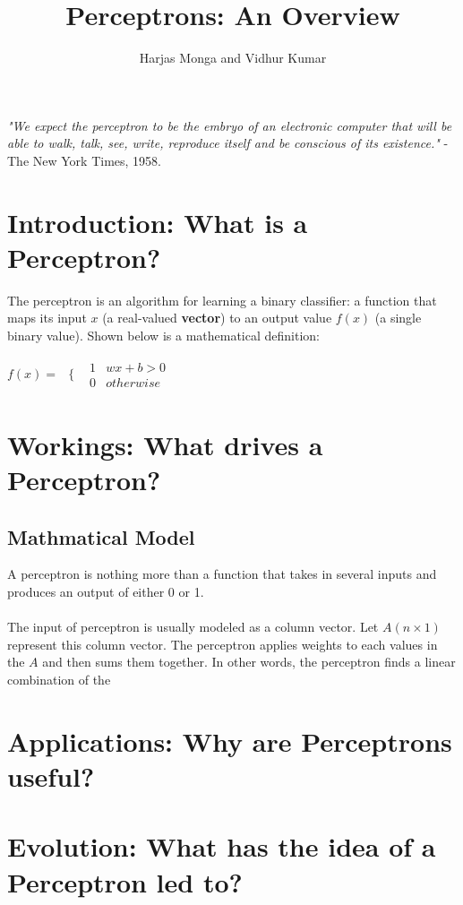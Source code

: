 \documentclass[12pt, titlepage, a4paper]{article}
\title{Perceptrons: An Overview}
\author{Harjas Monga and Vidhur Kumar}
\begin{document}
	\maketitle

	\textit{"We expect the perceptron to be the embryo of an electronic computer that will be able to walk, talk, see, write, reproduce itself and be conscious of its existence."} - The New York Times, 1958.	
	
	\section{Introduction: What is a Perceptron?}
	
	The perceptron is an algorithm for learning a binary classifier: a function that maps its input $x$ (a real-valued \textbf{vector}) to an output value $f(x)$ (a single binary value). Shown below is a mathematical definition: \\
	
	\begin{center}
		$f(x) = $
		$
\begin{array}{cc}
  \{ & 
    \begin{array}{cc}
    	1 & wx + b > 0 \\
    	0 & otherwise
    \end{array}
\end{array}
		$
	\end{center}
	
	\section{Workings: What drives a Perceptron?}
		
		\subsection{Mathmatical Model}	
		
		A perceptron is nothing more than a function that takes in several inputs and produces an output of either 0 or 1. \\ \\
		The input of perceptron is usually modeled as a column vector. Let $A(n\times1)$ represent this column vector. The perceptron applies weights to each values in the $A$ and then sums them together. In other words, the perceptron finds a linear combination of the 
	\section{Applications: Why are Perceptrons useful?}
	
	
	\section{Evolution: What has the idea of a Perceptron led to?}
\end{document}
